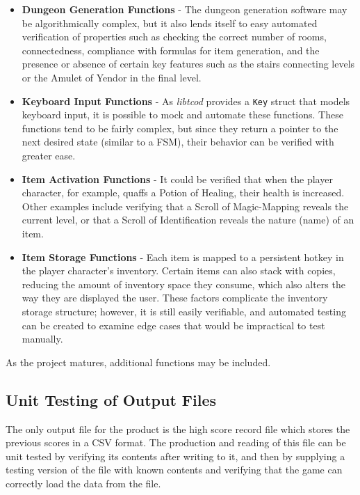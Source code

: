 \documentclass[12pt, titlepage]{article}
\begin{document}
		\begin{itemize}
			\item \textbf{Dungeon Generation Functions} - The dungeon generation software may be algorithmically complex, but it also lends itself to easy automated verification of properties such as checking the correct number of rooms, connectedness, compliance with formulas for item generation, and the presence or absence of certain key features such as the stairs connecting levels or the Amulet of Yendor in the final level.
			\item \textbf{Keyboard Input Functions} - As \textit{libtcod} provides a \lstinline$Key$ struct that models keyboard input, it is possible to mock and automate these functions.  These functions tend to be fairly complex, but since they return a pointer to the next desired state (similar to a FSM), their behavior can be verified with greater ease.
			\item \textbf{Item Activation Functions} - It could be verified that when the player character, for example, quaffs a Potion of Healing, their health is increased.  Other examples include verifying that a Scroll of Magic-Mapping reveals the current level, or that a Scroll of Identification reveals the nature (name) of an item.
			\item \textbf{Item Storage Functions} - Each item is mapped to a persistent hotkey in the player character's inventory.  Certain items can also stack with copies, reducing the amount of inventory space they consume, which also alters the way they are displayed the user.  These factors complicate the inventory storage structure; however, it is still easily verifiable, and automated testing can be created to examine edge cases that would be impractical to test manually.
		\end{itemize}

		As the project matures, additional functions may be included.

	\subsection{Unit Testing of Output Files}
		The only output file for the product is the high score record file which stores the previous scores in a CSV format.  The production and reading of this file can be unit tested by verifying its contents after writing to it, and then by supplying a testing version of the file with known contents and verifying that the game can correctly load the data from the file.
\end{document}
